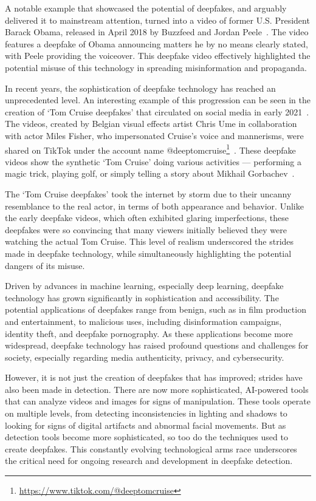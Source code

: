 A notable example that showcased the potential of deepfakes,
and arguably delivered it to mainstream attention, turned into a video of former
U.S. President Barack Obama, released in April 2018 by Buzzfeed and Jordan Peele~\cite{peele,10.1145/3371409}.
The video features a deepfake of Obama announcing matters he by no means clearly
stated, with Peele providing the voiceover. This deepfake video effectively highlighted
the potential misuse of this technology in spreading misinformation and propaganda.

In recent years, the sophistication of deepfake technology has reached an unprecedented level.
An interesting example of this progression can be seen in the creation of `Tom Cruise deepfakes'
that circulated on social media in early 2021~\cite{deeptomcruise-article}. The videos, created by Belgian visual effects
artist Chris Ume in collaboration with actor Miles Fisher, who impersonated Cruise's voice
and mannerisms, were shared on TikTok under the account name
@deeptomcruise\footnote{\url{https://www.tiktok.com/@deeptomcruise}}~\cite{Agarwal_2021_CVPR,belive-or-not}.
These deepfake videos show the synthetic `Tom Cruise' doing various activities --- performing
a magic trick, playing golf, or simply telling a story about Mikhail Gorbachev~\cite{deeptomcruise}.

The `Tom Cruise deepfakes' took the internet by storm due to their uncanny resemblance to the
real actor, in terms of both appearance and behavior. Unlike the early deepfake videos, which
often exhibited glaring imperfections, these deepfakes were so convincing that many viewers
initially believed they were watching the actual Tom Cruise. This level of realism underscored
the strides made in deepfake technology, while simultaneously highlighting the potential
dangers of its misuse.

Driven by advances in machine learning, especially deep learning, deepfake technology has
grown significantly in sophistication and accessibility. The potential applications of
deepfakes range from benign, such as in film production and entertainment, to malicious uses,
including disinformation campaigns, identity theft, and deepfake pornography. As these
applications become more widespread, deepfake technology has raised profound questions and
challenges for society, especially regarding media authenticity, privacy, and cybersecurity.

However, it is not just the creation of deepfakes that has improved; strides have also been made
in detection. There are now more sophisticated, \ac{AI}-powered tools that can analyze videos
and images for signs of manipulation. These tools operate on multiple levels, from detecting
inconsistencies in lighting and shadows to looking for signs of digital artifacts and abnormal
facial movements. But as detection tools become more sophisticated, so too do the techniques
used to create deepfakes. This constantly evolving technological arms race underscores the
critical need for ongoing research and development in deepfake detection.

